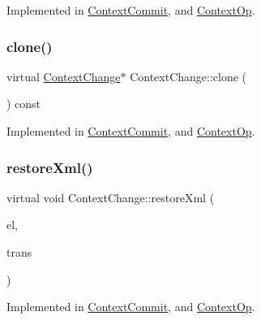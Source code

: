 Implemented in \mbox{\hyperlink{class_context_commit_a9f474b1411ad14072fbae6397298a449}{Context\+Commit}}, and \mbox{\hyperlink{class_context_op_aaaa3a32d48b60c9b3eef69a00b9cba2c}{Context\+Op}}.

\mbox{\label{class_context_change_ab1e858b15bc17c5dc375d5cda51dfeea}} 
\subsubsection{\texorpdfstring{clone()}{clone()}}
{\footnotesize\ttfamily virtual \mbox{\hyperlink{class_context_change}{Context\+Change}}$\ast$ Context\+Change\+::clone (\begin{DoxyParamCaption}\item[{void}]{ }\end{DoxyParamCaption}) const\hspace{0.3cm}{\ttfamily [pure virtual]}}



Implemented in \mbox{\hyperlink{class_context_commit_aa3eed58d105a955678d30a2371fd7050}{Context\+Commit}}, and \mbox{\hyperlink{class_context_op_a157a525c2c9db4f2cd01cb0dc579963e}{Context\+Op}}.

\mbox{\label{class_context_change_a95a77fd92582d479472c46e672262248}} 
\subsubsection{\texorpdfstring{restoreXml()}{restoreXml()}}
{\footnotesize\ttfamily virtual void Context\+Change\+::restore\+Xml (\begin{DoxyParamCaption}\item[{const \mbox{\hyperlink{class_element}{Element}} $\ast$}]{el,  }\item[{\mbox{\hyperlink{class_sleigh_base}{Sleigh\+Base}} $\ast$}]{trans }\end{DoxyParamCaption})\hspace{0.3cm}{\ttfamily [pure virtual]}}



Implemented in \mbox{\hyperlink{class_context_commit_ae695eedc084ebe7a75bd7f4d205518d0}{Context\+Commit}}, and \mbox{\hyperlink{class_context_op_ad116f3dd9045a92b84ae10eefaf74f04}{Context\+Op}}.

